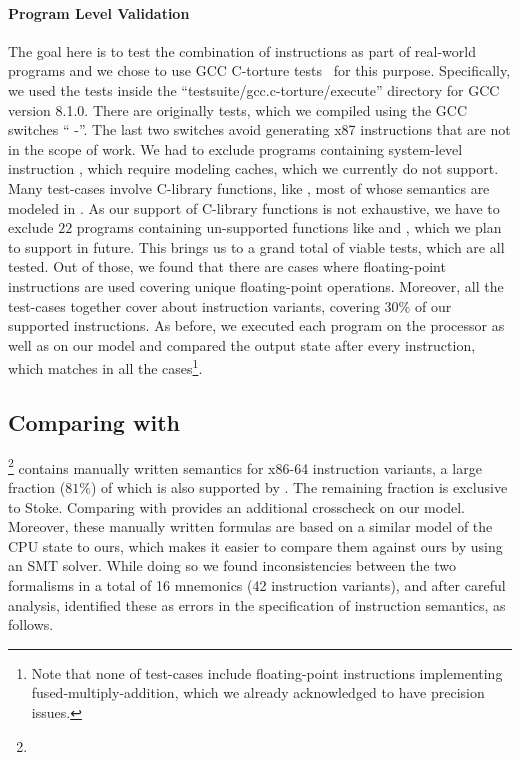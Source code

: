 \vspace{-2pt}
\paragraph{Program Level Validation}

The goal here is to test the combination of instructions as part of real-world programs and we chose to use GCC C-torture tests~\cite{CTORTURE} for this purpose. Specifically, we used the tests inside the ``testsuite/gcc.c-torture/execute'' directory for GCC version 8.1.0.  
There are originally \TortureTotal{} tests, which we compiled using the GCC switches ``     -''. The last two switches avoid generating x87 instructions that are not in the scope of work. We had to exclude \TortureExclude{} programs containing system-level instruction , which require modeling caches, which we currently do not support. Many test-cases involve C-library functions, like , most of whose semantics are modeled in \K. As our support of C-library functions is not exhaustive, we have to exclude $22$ programs containing un-supported functions like  and , which we plan to support in future. This brings us to a grand total of \TortureInclude{} viable tests, which are all tested. Out of those, we found that there are \TortureUifsInstr{} cases where floating-point instructions are used covering \TortureUifs{} unique floating-point operations. Moreover, all the test-cases together cover about \TortureCoverage{} instruction variants, covering  $30\%$ of our supported instructions. As before, we executed each program on the processor as well as  on our model and compared the output state after every instruction, which matches in all the cases\footnote{Note that none of test-cases include floating-point instructions implementing fused-multiply-addition, which we already acknowledged to have precision issues.}. 


\subsection{Comparing with \Stoke}\label{subsec:compare-stoke}
\footnote{} contains manually written semantics for \stokeIS{} x86-64 instruction variants, a large fraction ($81\%$) of which is also supported by \Strata. The remaining fraction is exclusive to Stoke. Comparing with \Stoke provides an additional crosscheck on our model.  Moreover, these manually written formulas are based on a similar model of the CPU state to ours, which makes it easier to compare them against ours by using an SMT solver. While doing so we found inconsistencies between the two formalisms in a total of 16 mnemonics (42 instruction variants), and after careful analysis, identified these as errors in the \Stoke specification of instruction semantics, as follows.

